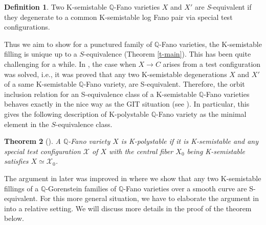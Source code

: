 \documentclass[12pt,reqno]{amsart}%
\newcommand{\cX}{{\mathcal{X}}}
\newtheorem{thm}{Theorem}[section]
\theoremstyle{definition}
\newtheorem{defn}[thm]{Definition}
\theoremstyle{remark}
\newcommand{\bQ}{{\mathbb{Q}}}
\begin{document}
\begin{defn}
Two K-semistable  $\mathbb{Q}$-Fano varieties $X$ and $X'$ are \emph{S}-equivalent  if they degenerate to a common K-semistable log Fano pair via special test configurations. 
\end{defn}

Thus we aim to show for a punctured family of $\bQ$-Fano varieties, the K-semistable filling is unique up to a $S$-equivalence (Theorem \ref{t-main}).
This has been quite challenging for a while. In \cite{LWX18}, the case when $X \to C$ arises from a test configuration was solved, i.e., it was proved that any two K-semistable degenerations $X$ and $X'$ of a same K-semistable $\mathbb{Q}$-Fano variety, are S-equivalent. Therefore, the orbit inclusion relation for an S-equivalence class of a K-semistable $\bQ$-Fano varieties behaves exactly in the nice way as the GIT situation (see \cite[Thm. 3.5]{New78}). 
In particular, this gives the following description of K-polystable $\mathbb{Q}$-Fano variety as the minimal element in the $S$-equivalence class.
\begin{thm}[{\cite{LWX18}}]\label{t-sequivalence}
A  $\mathbb{Q}$-Fano variety $X$ is \emph{K-polystable} if it is K-semistable and any special test configuration $\cX$ of $X$ with  the central fiber $X_0$ being K-semistable satisfies $X\simeq \cX_0$. 
\end{thm}
The argument in \cite{LWX18} later was improved in \cite{BX19} where we show that any two K-semistable fillings of a $\mathbb{Q}$-Gorenstein families of $\mathbb{Q}$-Fano varieties over a smooth curve are S-equivalent. 
For this more general situation, we have to elaborate the argument in \cite{LWX18} into a relative setting. We will discuss more details in the proof of the theorem below. 
\end{document}
